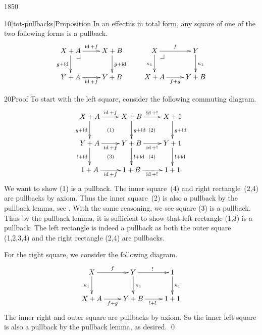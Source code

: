 \begin{parsec}{1850}%
\begin{point}{10}[tot-pullbacks]{Proposition}%
In an effectus in total form,
    any square of one of the two following forms is a pullback.
\begin{equation*}
    \xymatrix{
        X+A \pullback \ar[r]^{\id+f} \ar[d]_{g + \id}
        & X+B \ar[d]^{g+\id}
        \\ Y+A \ar[r]_{\id+f}
        & Y+B
    } \qquad
    \xymatrix{
        X \pullback \ar[d]_{\kappa_1} \ar[r]^{f}
        & Y \ar[d]^{\kappa_1}
        \\
        X+A \ar[r]_{f+g}
        & Y+B
    }
\end{equation*}
\begin{point}{20}{Proof}%
To start with the left square, consider the following commuting diagram.
\begin{equation*}
    \xymatrix{
        X+A \ar@{}[rd]|{(1)} \ar[r]^{\id+f} \ar[d]_{g + \id}
        & X+B \ar@{}[rd]|{(2)} \ar[d]^{g+\id} \ar[r]^{\id+!}
        & X+1 \ar[d]^{g+\id}
        \\ Y+A \ar@{}[rd]|{(3)} \ar[r]_{\id+f} \ar[d]_{!+\id}
        & Y+B \ar@{}[rd]|{(4)} \ar[r]_{\id+!} \ar[d]^{!+\id}
        & Y+1 \ar[d]^{!+\id}
        \\ 1+A \ar[r]_{\id+f}
        & 1+B \ar[r]_{\id+!}
        & 1+1
    }
\end{equation*}
We want to show (1) is a pullback.
The inner square~(4) and right rectangle~(2,4) are pullbacks by axiom.
Thus the inner square~(2) is also a pullback
    by the pullback lemma, see .
With the same reasoning, we see square (3) is a pullback.
Thus by the pullback lemma, it is sufficient to show that
    left rectangle (1,3) is a pullback.
The left rectangle is indeed a pullback
as both the outer square (1,2,3,4)
    and the right rectangle (2,4) are pullbacks.

For the right square, we consider the following diagram.
\begin{equation*}
    \xymatrix{
         X \ar[r]^f \ar[d]_{\kappa_1}
        & Y \ar[r]^{!} \ar[d]^{\kappa_1}
        &1 \ar[d]^{\kappa_1}
        \\ X+A \ar[r]_{f+g}
        & Y+B \ar[r]_{!+!}
        & 1+1
    }
\end{equation*}
The inner right and outer square are pullbacks by axiom.
So the inner left square is also a pullback by the pullback lemma, as desired.
    \qed
\end{point}
\end{point}
\end{parsec}

